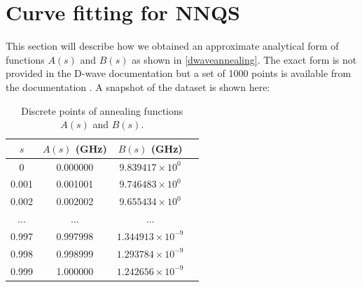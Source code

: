 \chapter{Curve fitting for NNQS}\label{appendix:curvefitting}
This section will describe how we obtained an approximate analytical form of functions $A(s)$ and $B(s)$ as shown in \autoref{dwaveannealing}. The exact form is not provided in the D-wave documentation but a set of 1000 points is available from the documentation \cite{dwavefunctions}. A snapshot of the dataset is shown here:
\begin{table}[!h]
    \centering
    \begin{tabular}{cccc}
    \hline
    $s$ & $A(s)$ (GHz) & $B(s)$ (GHz)\\
    \hline
    0 & 0.000000 & $9.839417 \times 10^0$ \\
    0.001 & 0.001001 & $9.746483 \times 10^0$ \\
    0.002 & 0.002002 & $9.655434 \times 10^0$ \\
    ... & ... & ... \\
    0.997 & 0.997998 & $1.344913 \times 10^{-9}$\\
    0.998 & 0.998999 & $1.293784 \times 10^{-9}$\\
    0.999 & 1.000000 & $1.242656 \times 10^{-9}$\\
    \hline
    \end{tabular}
    \caption{Discrete points of annealing functions $A(s)$ and $B(s)$.}
    \label{tab:dwavefunction}
\end{table}

